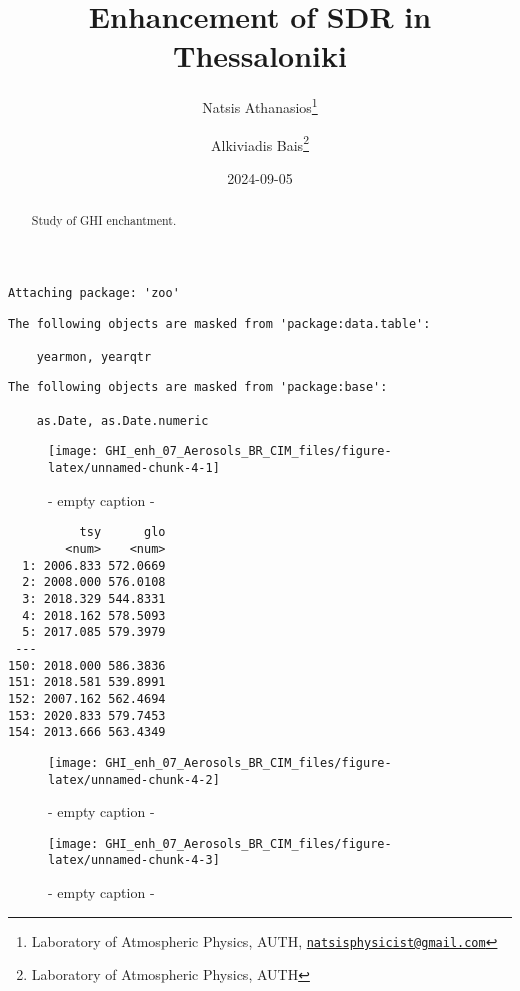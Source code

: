 \documentclass[
  10pt,
  a4paper,oneside]{article}
\title{Enhancement of SDR in Thessaloniki}
\author{Natsis Athanasios\footnote{Laboratory of Atmospheric Physics, AUTH, \href{mailto:natsisphysicist@gmail.com}{\nolinkurl{natsisphysicist@gmail.com}}} \and Alkiviadis Bais\footnote{Laboratory of Atmospheric Physics, AUTH}}
\date{2024-09-05}
\begin{document}
\maketitle
\begin{abstract}
Study of GHI enchantment.
\end{abstract}

{
\hypersetup{linkcolor=}
\setcounter{tocdepth}{4}
\tableofcontents
}
\begin{verbatim}
Attaching package: 'zoo'
\end{verbatim}

\begin{verbatim}
The following objects are masked from 'package:data.table':

    yearmon, yearqtr
\end{verbatim}

\begin{verbatim}
The following objects are masked from 'package:base':

    as.Date, as.Date.numeric
\end{verbatim}

\begin{figure}[H]

{\centering \texttt{[image: GHI\_enh\_07\_Aerosols\_BR\_CIM\_files/figure-latex/unnamed-chunk-4-1]} 

}

\caption{ - empty caption - }\label{fig:unnamed-chunk-4-1}
\end{figure}

\begin{verbatim}
          tsy      glo
        <num>    <num>
  1: 2006.833 572.0669
  2: 2008.000 576.0108
  3: 2018.329 544.8331
  4: 2018.162 578.5093
  5: 2017.085 579.3979
 ---                  
150: 2018.000 586.3836
151: 2018.581 539.8991
152: 2007.162 562.4694
153: 2020.833 579.7453
154: 2013.666 563.4349
\end{verbatim}

\begin{figure}[H]

{\centering \texttt{[image: GHI\_enh\_07\_Aerosols\_BR\_CIM\_files/figure-latex/unnamed-chunk-4-2]} 

}

\caption{ - empty caption - }\label{fig:unnamed-chunk-4-2}
\end{figure}
\begin{figure}[H]

{\centering \texttt{[image: GHI\_enh\_07\_Aerosols\_BR\_CIM\_files/figure-latex/unnamed-chunk-4-3]} 

}

\caption{ - empty caption - }\label{fig:unnamed-chunk-4-3}
\end{figure}
\end{document}
